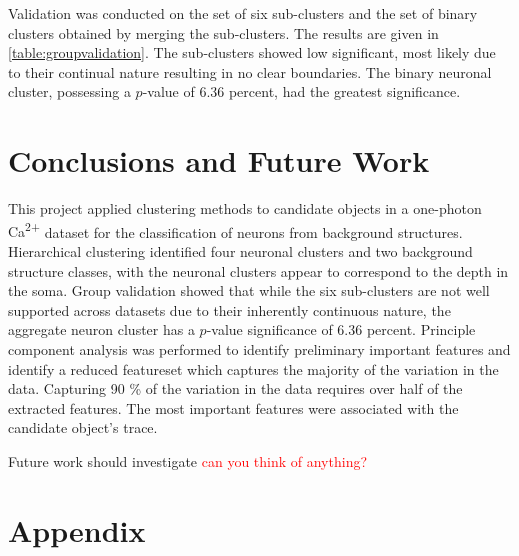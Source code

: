 \documentclass[10pt]{article}
\newcommand{\calcium}[0]{Ca\textsuperscript{2+}}
\newcommand{\todo}[1]{\textcolor{red}{#1}}
\begin{document}
Validation was conducted on the set of six sub-clusters and the set of binary clusters obtained by merging the sub-clusters. The results are given in \cref{table:groupvalidation}. The sub-clusters showed low significant, most likely due to their continual nature resulting in no clear boundaries.
The binary neuronal cluster, possessing a $p$-value of \num{6.36} percent, had the greatest significance.

\section{Conclusions and Future Work}

This project applied clustering methods to candidate objects in a one-photon {\calcium} dataset for the classification of neurons from background structures.
Hierarchical clustering identified four neuronal clusters and two background structure classes, with the neuronal clusters appear to correspond to the depth in the soma.
Group validation showed that while the six sub-clusters are not well supported across datasets due to their inherently continuous nature, the aggregate neuron cluster has a $p$-value significance of \num{6.36} percent.
Principle component analysis was performed to identify preliminary important features and identify a reduced featureset which captures the majority of the variation in the data. Capturing \num{90} \% of the variation in the data requires over half of the extracted features. The most important features were associated with the candidate object's trace.

Future work should investigate \todo{can you think of anything?}

\printbibliography

\newpage

\section*{Appendix}
\end{document}
